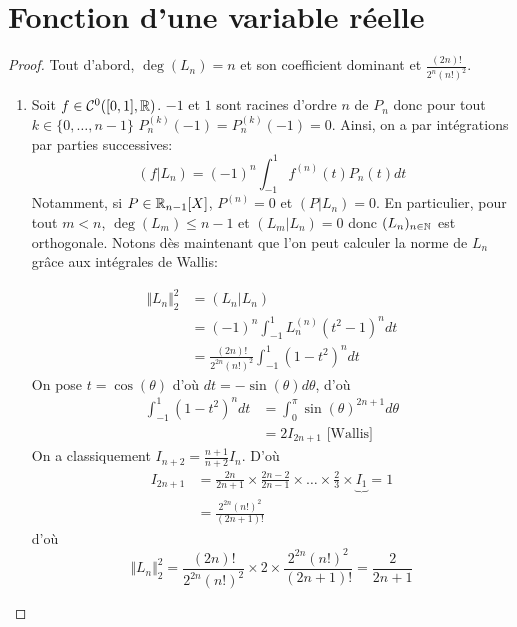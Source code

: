 \section{Fonction d'une variable réelle}

\begin{proof}
	Tout d'abord, $\deg(L_{n})=n$ et  son coefficient dominant et $\frac{(2n)!}{2^{n}(n!)^{2}}$.
	\begin{enumerate}
		\item Soit $f\in\mathcal{C}^{0}([0,1],\mathbb{R})$. $-1$ et $1$ sont racines d'ordre $n$ de $P_{n}$ donc pour tout $k\in\{0,\dots,n-1\}$ $P_{n}^{(k)}(-1)=P_{n}^{(k)}(-1)=0$. Ainsi, on a par intégrations par parties successives:
		\begin{equation}(f|L_{n})=(-1)^{n}\int_{-1}^{1}f^{(n)}(t)P_{n}(t)dt\end{equation}
		Notamment, si $P\in\mathbb{R}_{n-1}[X]$, $P^{(n)}=0$ et $(P|L_{n})=0$. En particulier, pour tout $m<n$, $\deg(L_{m})\leqslant n-1$ et $(L_{m}|L_{n})=0$ donc $(L_{n})_{n\in\mathbb{N}}$ est orthogonale. Notons dès maintenant que l'on peut calculer la norme de $L_{n}$ grâce aux intégrales de Wallis:
		
		\begin{align}
			\Vert L_{n}\Vert_{2}^{2}
			&=(L_{n}|L_{n})\\
			&=(-1)^{n}\int_{-1}^{1}L_{n}^{(n)}(t^{2}-1)^{n}dt\\
			&=\frac{(2n)!}{2^{2n}(n!)^{2}}\int_{-1}^{1}(1-t^{2})^{n}dt
		\end{align}
		On pose $t=\cos(\theta)$ d'où $dt=-\sin(\theta)d\theta$, d'où
		\begin{align}
			\int_{-1}^{1}(1-t^{2})^{n}dt
			&=\int_{0}^{\pi}\sin(\theta)^{2n+1}d\theta\\
			&=2I_{2n+1}\text{ [Wallis] }
		\end{align}
		On a classiquement $I_{n+2}=\frac{n+1}{n+2}I_{n}$.
		D'où
		\begin{align}
			I_{2n+1}
			&=\frac{2n}{2n+1}\times\frac{2n-2}{2n-1}\times\dots\times\frac{2}{3}\times \underbrace{I_{1}}{=1}\\
			&=\frac{2^{2n}(n!)^{2}}{(2n+1)!}
		\end{align}
		d'où
		\begin{equation}\Vert L_{n}\Vert_{2}^{2}=\frac{(2n)!}{2^{2n}(n!)^{2}}\times 2\times \frac{2^{2n}(n!)^{2}}{(2n+1)!}=\frac{2}{2n+1}\end{equation}


\end{enumerate}
\end{proof}
